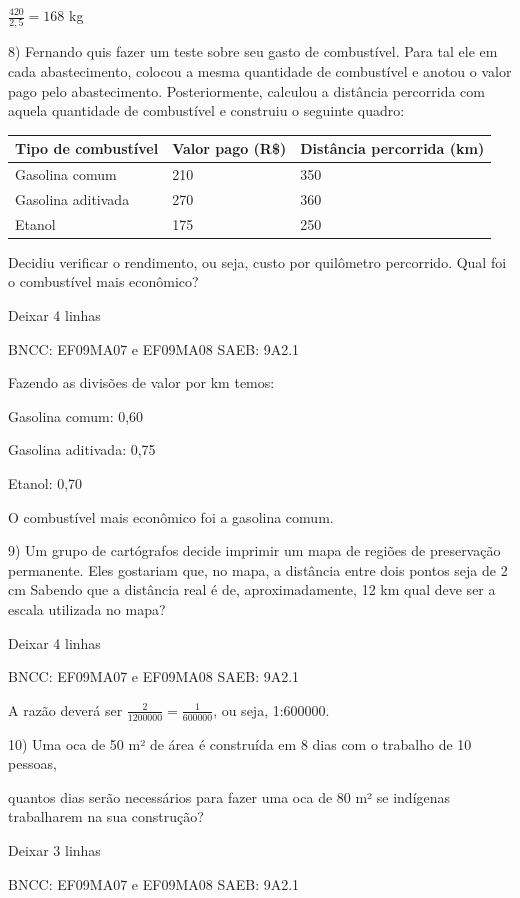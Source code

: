 \begin{escolha}
{{{\begin{escolha}
{\(\frac{420}{2,5} = 168\) kg

8) Fernando quis fazer um teste sobre seu gasto de combustível. Para tal
ele em cada abastecimento, colocou a mesma quantidade de combustível e
anotou o valor pago pelo abastecimento. Posteriormente, calculou a
distância percorrida com aquela quantidade de combustível e construiu o
seguinte quadro:

\begin{longtable}[]{@{}lll@{}}
\toprule\noalign{}
\textbf{Tipo de combustível} & \textbf{Valor pago (R\$)} &
\textbf{Distância percorrida (km)} \\
\midrule\noalign{}
\endhead
\bottomrule\noalign{}
\endlastfoot
Gasolina comum & 210 & 350 \\
Gasolina aditivada & 270 & 360 \\
Etanol & 175 & 250 \\
\end{longtable}

Decidiu verificar o rendimento, ou seja, custo por quilômetro
percorrido. Qual foi o combustível mais econômico?

Deixar 4 linhas

BNCC: EF09MA07 e EF09MA08 SAEB: 9A2.1

Fazendo as divisões de valor por km temos:

Gasolina comum: 0,60

Gasolina aditivada: 0,75

Etanol: 0,70

O combustível mais econômico foi a gasolina comum.

9) Um grupo de cartógrafos decide imprimir um mapa de regiões de
preservação permanente. Eles gostariam que, no mapa, a distância entre
dois pontos seja de 2 cm Sabendo que a distância real é de,
aproximadamente, 12 km qual deve ser a escala utilizada no mapa?

Deixar 4 linhas

BNCC: EF09MA07 e EF09MA08 SAEB: 9A2.1

A razão deverá ser \(\frac{2}{1200000} = \frac{1}{600000}\), ou seja,
1:600000.

10) Uma oca de 50 m² de área é construída em 8 dias com o trabalho de 10
pessoas,

quantos dias serão necessários para fazer uma oca de 80 m² se indígenas
trabalharem na sua construção?

Deixar 3 linhas

BNCC: EF09MA07 e EF09MA08 SAEB: 9A2.1

}
\end{escolha}}}}
\end{escolha}
